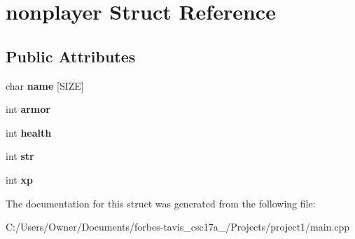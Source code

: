 \hypertarget{structnonplayer}{}\section{nonplayer Struct Reference}
\label{structnonplayer}
\subsection*{Public Attributes}
\begin{DoxyCompactItemize}
\item 
\hypertarget{structnonplayer_af8a2f5ba17953230b14b76a81697f965}{}char {\bfseries name} \mbox{[}S\+I\+Z\+E\mbox{]}\label{structnonplayer_af8a2f5ba17953230b14b76a81697f965}

\item 
\hypertarget{structnonplayer_a061dfdb91e8cad9ec1303d5b3aa51a52}{}int {\bfseries armor}\label{structnonplayer_a061dfdb91e8cad9ec1303d5b3aa51a52}

\item 
\hypertarget{structnonplayer_ad01cbeeaa67bdddfbcf46adb8257b8c1}{}int {\bfseries health}\label{structnonplayer_ad01cbeeaa67bdddfbcf46adb8257b8c1}

\item 
\hypertarget{structnonplayer_af9764104c0fda7a23730e8bf92731060}{}int {\bfseries str}\label{structnonplayer_af9764104c0fda7a23730e8bf92731060}

\item 
\hypertarget{structnonplayer_ae48163b766eccdb7cea0bb44bbcbd748}{}int {\bfseries xp}\label{structnonplayer_ae48163b766eccdb7cea0bb44bbcbd748}

\end{DoxyCompactItemize}


The documentation for this struct was generated from the following file\+:\begin{DoxyCompactItemize}
\item 
C\+:/\+Users/\+Owner/\+Documents/forbes-\/tavis\+\_\+csc17a\+\_/\+Projects/project1/main.\+cpp\end{DoxyCompactItemize}
